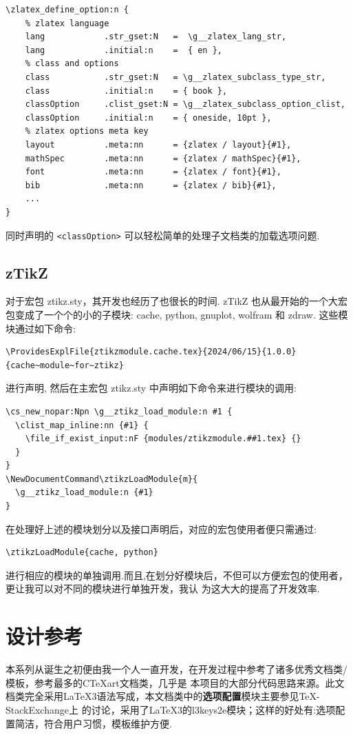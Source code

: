\documentclass[
  hyper,    
  lang=cn,
  class=book,
  mathSpec={envStyle=leftbar, alias},
  toc={redef}
]{zlatex}
\begin{document}
\begin{verbatim}
\zlatex_define_option:n {
    % zlatex language
    lang            .str_gset:N   =  \g__zlatex_lang_str,
    lang            .initial:n    =  { en },
    % class and options
    class           .str_gset:N   = \g__zlatex_subclass_type_str,
    class           .initial:n    = { book },
    classOption     .clist_gset:N = \g__zlatex_subclass_option_clist,
    classOption     .initial:n    = { oneside, 10pt },
    % zlatex options meta key 
    layout          .meta:nn      = {zlatex / layout}{#1},
    mathSpec        .meta:nn      = {zlatex / mathSpec}{#1},
    font            .meta:nn      = {zlatex / font}{#1},
    bib             .meta:nn      = {zlatex / bib}{#1},
    ...
}
\end{verbatim}

同时声明的 \texttt{<classOption>} 可以轻松简单的处理子文档类的加载选项问题.

\subsection{zTikZ}
对于宏包 ztikz.sty，其开发也经历了也很长的时间. zTikZ 也从最开始的一个大宏包变成了一个个的小的子模块:
cache, python, gnuplot, wolfram 和 zdraw. 这些模块通过如下命令:

\begin{verbatim}
\ProvidesExplFile{ztikzmodule.cache.tex}{2024/06/15}{1.0.0}{cache~module~for~ztikz}
\end{verbatim}

进行声明, 然后在主宏包 ztikz.sty 中声明如下命令来进行模块的调用:
\begin{verbatim}
\cs_new_nopar:Npn \g__ztikz_load_module:n #1 {
  \clist_map_inline:nn {#1} {
    \file_if_exist_input:nF {modules/ztikzmodule.##1.tex} {}
  }
}
\NewDocumentCommand\ztikzLoadModule{m}{
  \g__ztikz_load_module:n {#1}
}
\end{verbatim}

在处理好上述的模块划分以及接口声明后，对应的宏包使用者便只需通过:
\begin{verbatim}
\ztikzLoadModule{cache, python}
\end{verbatim}

进行相应的模块的单独调用.而且,在划分好模块后，不但可以方便宏包的使用者，更让我可以对不同的模块进行单独开发，我认
为这大大的提高了开发效率.

\section{设计参考}
本系列从诞生之初便由我一个人一直开发，在开发过程中参考了诸多优秀文档类/模板，参考最多的{C\TeX{}art}文档类，几乎是
本项目的大部分代码思路来源。此文档类完全采用\LaTeX3语法写成，本文档类中的\textbf{选项配置}模块主要参见\TeX-StackExchange上
的讨论，采用了\LaTeX3的l3keys2e模块；这样的好处有:选项配置简洁，符合用户习惯，模板维护方便.
\end{document}
